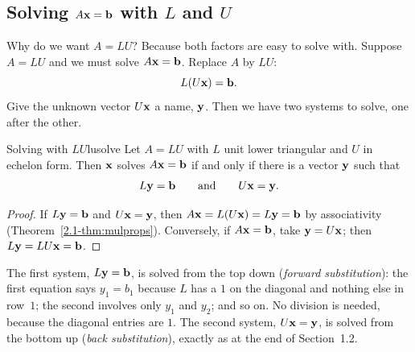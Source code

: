 \documentclass[11pt]{article}
\begin{document}
\subsection*{Solving $A\mathbf{x}=\mathbf{b}$ with $L$ and $U$}

Why do we want $A=LU$? Because both factors are easy to solve with. Suppose $A=LU$ and we must solve $A\mathbf{x}=\mathbf{b}$. Replace $A$ by $LU$:
\[
L(U\mathbf{x})=\mathbf{b}.
\]
Give the unknown vector $U\mathbf{x}$ a name, $\mathbf{y}$. Then we have two systems to solve, one after the other.

\begin{thm}{Solving with $LU$}{lusolve}
Let $A=LU$ with $L$ unit lower triangular and $U$ in echelon form. Then $\mathbf{x}$ solves $A\mathbf{x}=\mathbf{b}$ if and only if there is a vector $\mathbf{y}$ such that
\[
L\mathbf{y}=\mathbf{b}\qquad\text{and}\qquad U\mathbf{x}=\mathbf{y}.
\]
\end{thm}

\begin{proof}
If $L\mathbf{y}=\mathbf{b}$ and $U\mathbf{x}=\mathbf{y}$, then $A\mathbf{x}=L(U\mathbf{x})=L\mathbf{y}=\mathbf{b}$ by associativity (Theorem~\ref{2.1-thm:mulprops}). Conversely, if $A\mathbf{x}=\mathbf{b}$, take $\mathbf{y}=U\mathbf{x}$; then $L\mathbf{y}=LU\mathbf{x}=\mathbf{b}$.
\end{proof}

The first system, $L\mathbf{y}=\mathbf{b}$, is solved from the top down (\emph{forward substitution}): the first equation says $y_1=b_1$ because $L$ has a $1$ on the diagonal and nothing else in row~$1$; the second involves only $y_1$ and $y_2$; and so on. No division is needed, because the diagonal entries are $1$. The second system, $U\mathbf{x}=\mathbf{y}$, is solved from the bottom up (\emph{back substitution}), exactly as at the end of Section~1.2.

\begin{center}
\end{center}
\end{document}

